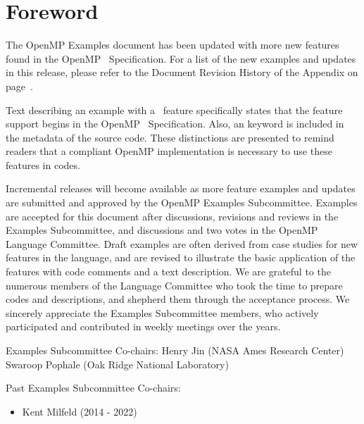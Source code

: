 \chapter*{Foreword}
\label{chap:foreword}

The OpenMP Examples document has been updated with more new features
found in the OpenMP \SVER\ Specification. 
For a list of the new examples and updates in this release,
please refer to the Document Revision History of the Appendix on page~\pageref{chap:history}.

Text describing an example with a \SVER\ feature specifically states
that the feature support begins in the OpenMP \SVER\ Specification.  Also,
an  keyword is included in the  metadata of the source code.
These distinctions are presented to remind readers that a \SVER\-compliant 
OpenMP implementation is necessary to use these features in codes.

Incremental releases will become available as more feature examples
and updates are submitted and approved by the OpenMP Examples Subcommittee.
Examples are accepted for this document after discussions, revisions and reviews
in the Examples Subcommittee, and discussions and two votes
in the OpenMP Language Committee.
Draft examples are often derived from case studies for new features in the language,
and are revised to illustrate the basic application of the features with code comments
and a text description. We are grateful to the numerous members of the Language Committee 
who took the time to prepare codes and descriptions, and shepherd them through
the acceptance process. We sincerely appreciate the Examples Subcommittee members, who 
actively participated and contributed in weekly meetings over the years.

\bigskip
Examples Subcommittee Co-chairs: \smallskip\linebreak
Henry Jin (\textsc{NASA} Ames Research Center) \linebreak
Swaroop Pophale (Oak Ridge National Laboratory)

\bigskip
\bigskip
Past Examples Subcommittee Co-chairs:
\begin{itemize}
\item Kent Milfeld (2014 - 2022)
\end{itemize}


